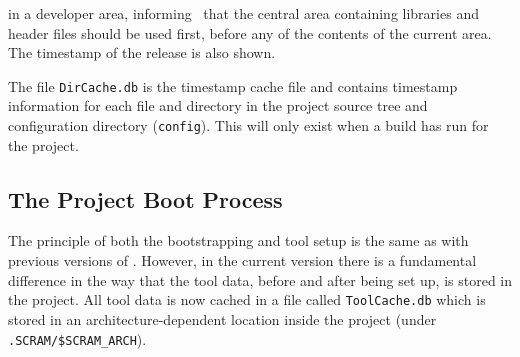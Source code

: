\ni in a developer area, informing \scram\ that the central area containing libraries and
header files should be used first, before any of the contents of the
current area. The timestamp of the release is also shown.

\ni The file \texttt{DirCache.db} is the timestamp cache file and
contains timestamp information for each file and directory in the
project source tree and configuration directory (\texttt{config}).
This will only exist when a build has run for the project.

\subsection{The Project Boot Process}
The principle of both the bootstrapping and tool setup is the same as
with previous versions of \scram. However, in the current version there is a fundamental
difference in the way that the tool data, before and after being set
up, is stored in the project.
All tool data is now cached in a file called \texttt{ToolCache.db} which is
stored in an architecture-dependent location inside the 
project (\ie under \texttt{.SCRAM/\$SCRAM\_ARCH}).

